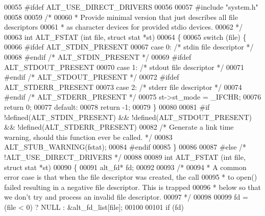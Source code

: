 \begin{DoxyCode}
00055 \textcolor{preprocessor}{#ifdef ALT\_USE\_DIRECT\_DRIVERS}
00056 
00057 \textcolor{preprocessor}{#include "system.h"}
00058 
00059 \textcolor{comment}{/*}
00060 \textcolor{comment}{ * Provide minimal version that just describes all file descriptors }
00061 \textcolor{comment}{ * as character devices for provided stdio devices.}
00062 \textcolor{comment}{ */}
00063 \textcolor{keywordtype}{int} ALT_FSTAT (\textcolor{keywordtype}{int} file, \textcolor{keyword}{struct} stat *st)
00064 \{
00065     \textcolor{keywordflow}{switch} (file) \{
00066 \textcolor{preprocessor}{#ifdef ALT\_STDIN\_PRESENT}
00067     \textcolor{keywordflow}{case} 0: \textcolor{comment}{/* stdin file descriptor */}
00068 \textcolor{preprocessor}{#endif }\textcolor{comment}{/* ALT\_STDIN\_PRESENT */}\textcolor{preprocessor}{}
00069 \textcolor{preprocessor}{#ifdef ALT\_STDOUT\_PRESENT}
00070     \textcolor{keywordflow}{case} 1: \textcolor{comment}{/* stdout file descriptor */}
00071 \textcolor{preprocessor}{#endif }\textcolor{comment}{/* ALT\_STDOUT\_PRESENT */}\textcolor{preprocessor}{}
00072 \textcolor{preprocessor}{#ifdef ALT\_STDERR\_PRESENT}
00073     \textcolor{keywordflow}{case} 2: \textcolor{comment}{/* stderr file descriptor */}
00074 \textcolor{preprocessor}{#endif }\textcolor{comment}{/* ALT\_STDERR\_PRESENT */}\textcolor{preprocessor}{}
00075         st->st\_mode = \_IFCHR;
00076         \textcolor{keywordflow}{return} 0;
00077     \textcolor{keywordflow}{default}:
00078         \textcolor{keywordflow}{return} -1;
00079     \}
00080 
00081 \textcolor{preprocessor}{#if !defined(ALT\_STDIN\_PRESENT) && !defined(ALT\_STDOUT\_PRESENT) && !defined(ALT\_STDERR\_PRESENT)}
00082     \textcolor{comment}{/* Generate a link time warning, should this function ever be called. */}
00083     ALT_STUB_WARNING(fstat);
00084 \textcolor{preprocessor}{#endif}
00085 \}
00086 
00087 \textcolor{preprocessor}{#else }\textcolor{comment}{/* !ALT\_USE\_DIRECT\_DRIVERS */}\textcolor{preprocessor}{}
00088 
00089 \textcolor{keywordtype}{int} ALT_FSTAT (\textcolor{keywordtype}{int} file, \textcolor{keyword}{struct} stat *st)
00090 \{
00091   alt_fd*  fd;
00092 
00093   \textcolor{comment}{/*}
00094 \textcolor{comment}{   * A common error case is that when the file descriptor was created, the call}
00095 \textcolor{comment}{   * to open() failed resulting in a negative file descriptor. This is trapped}
00096 \textcolor{comment}{   * below so that we don't try and process an invalid file descriptor.}
00097 \textcolor{comment}{   */}
00098 
00099   fd = (file < 0) ? NULL : &alt_fd_list[file];
00100   
00101   \textcolor{keywordflow}{if} (fd)

\end{DoxyCode}
